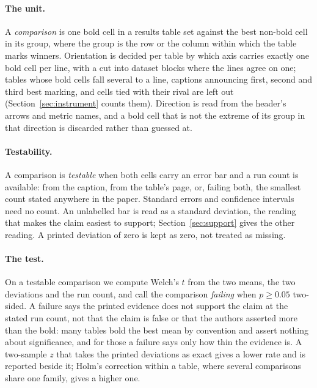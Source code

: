 \documentclass[sigconf,anonymous]{aamas}
\begin{document}
\paragraph{The unit.} A \emph{comparison} is one bold cell in a results table
set against the best non-bold cell in its group, where the group is the row or
the column within which the table marks winners. Orientation is decided per
table by which axis carries exactly one bold cell per line, with a cut into
dataset blocks where the lines agree on one; tables whose bold cells fall
several to a line, captions announcing first, second and third best marking,
and cells tied with their rival are left out (Section~\ref{sec:instrument}
counts them). Direction is read from the header's arrows and metric names,
and a bold cell that is not the extreme of its group in that direction is
discarded rather than guessed at.

\paragraph{Testability.} A comparison is \emph{testable} when both cells carry
an error bar and a run count is available: from the caption, from the table's
page, or, failing both, the smallest count stated anywhere in the paper.
Standard errors and confidence intervals need no count. An unlabelled bar is
read as a standard deviation, the reading that makes the claim easiest to
support; Section~\ref{sec:support} gives the other reading. A printed
deviation of zero is kept as zero, not treated as missing.

\paragraph{The test.} On a testable comparison we compute Welch's $t$ from the
two means, the two deviations and the run count, and call the comparison
\emph{failing} when $p \geq 0.05$ two-sided. A failure says the printed
evidence does not support the claim at the stated run count, not that the
claim is false or that the authors asserted more than the bold: many tables
bold the best mean by convention and assert nothing about significance, and
for those a failure says only how thin the evidence is. A two-sample $z$
that takes the printed deviations as exact gives a lower rate and is
reported beside it; Holm's correction within a table, where several
comparisons share one family, gives a higher one.
\end{document}
